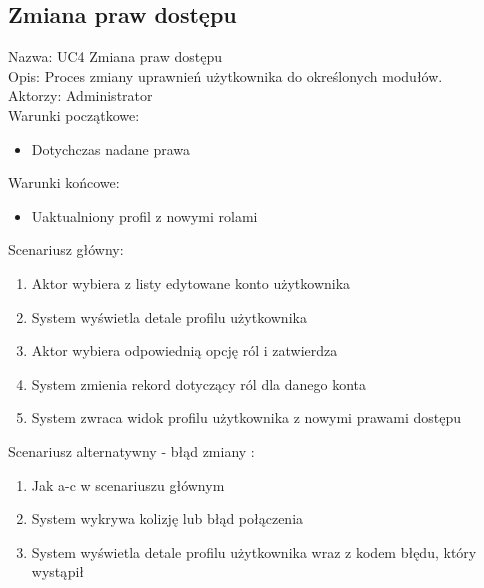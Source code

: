 \subsection{Zmiana praw dostępu}
\begin{adjustwidth}{5em}{0pt}
Nazwa: UC4 Zmiana praw dostępu \\
Opis: Proces zmiany uprawnień użytkownika do określonych modułów. \\
Aktorzy: Administrator \\
Warunki początkowe:
\begin{itemize}
\item Dotychczas nadane prawa 
\end{itemize}
Warunki końcowe: 
\begin{itemize}
\item Uaktualniony profil z nowymi rolami
\end{itemize}
Scenariusz główny: 
\begin{enumerate}
\item Aktor wybiera z listy edytowane konto użytkownika
\item System wyświetla detale profilu użytkownika
\item Aktor wybiera odpowiednią opcję ról i zatwierdza
\item System zmienia rekord dotyczący ról dla danego konta
\item System zwraca widok profilu użytkownika z nowymi prawami dostępu
\end{enumerate}
Scenariusz alternatywny - błąd zmiany : 
\begin{enumerate}
\item Jak a-c w scenariuszu głównym
\item System wykrywa kolizję lub błąd połączenia
\item System wyświetla detale profilu użytkownika wraz z kodem błędu, który wystąpił
\end{enumerate}
\end{adjustwidth}

